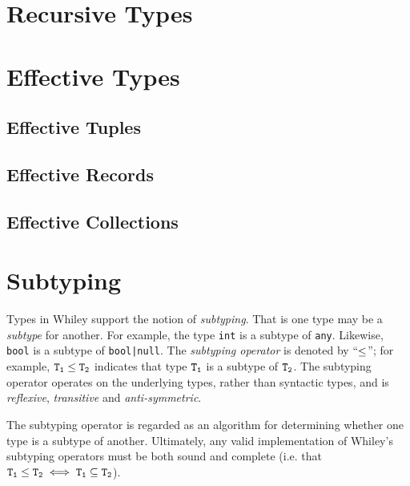 \section{Recursive Types}
\label{c_types_recursive}

\section{Effective Types}
\label{c_types_effective}

\subsection{Effective Tuples}
\subsection{Effective Records}
\label{c_types_effective_records}
\subsection{Effective Collections}

\section{Subtyping}
\label{c_types_subtyping}
Types in Whiley support the notion of {\em subtyping}.  That is one type may be a {\em subtype} for another.  For example, the type \lstinline{int} is a subtype of \lstinline{any}.  Likewise, \lstinline{bool} is a subtype of \lstinline{bool|null}.  The {\em subtyping operator} is denoted by ``${\tt \le}$''; for example, ${\tt T_1\le T_2}$ indicates that type ${\tt T_1}$ is a subtype of ${\tt T_2}$.  The subtyping operator operates on the underlying types, rather than syntactic types, and is {\em reflexive}, {\em transitive} and {\em anti-symmetric}. 

The subtyping operator is regarded as an algorithm for determining whether one type is a subtype of another.  Ultimately, any valid implementation of Whiley's subtyping operators must be both sound and complete (i.e. that ${\tt T_1\le T_2 \iff T_1 \subseteq T_2}$). 

